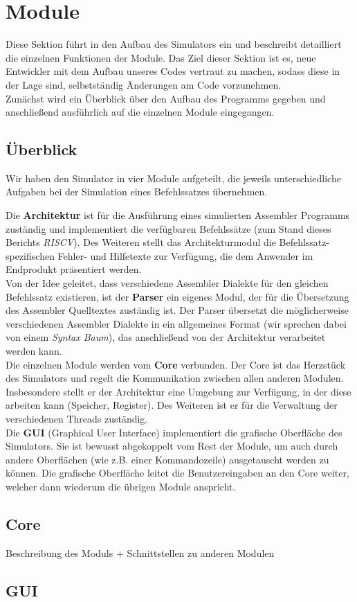 
\section{Module}

Diese Sektion führt in den Aufbau des Simulators ein und beschreibt detailliert
die einzelnen Funktionen der Module. Das Ziel dieser Sektion ist es, neue
Entwickler mit dem Aufbau unseres Codes vertraut zu machen, sodass diese in der
Lage sind, selbstständig Änderungen am Code vorzunehmen. \\
Zunächst wird ein Überblick über den Aufbau des Programms gegeben und
anschließend ausführlich auf die einzelnen Module eingegangen.

\subsection{Überblick}

Wir haben den Simulator in vier Module aufgeteilt, die jeweils unterschiedliche
Aufgaben bei der Simulation eines Befehlssatzes übernehmen.

Die \textbf{Architektur} ist für die Ausführung eines simulierten Assembler
Programms zuständig und implementiert die verfügbaren Befehlssätze (zum Stand
dieses Berichts \textit{RISCV}). Des Weiteren stellt das Architekturmodul
die Befehlssatz-spezifischen Fehler- und Hilfetexte zur Verfügung, die dem
Anwender im Endprodukt präsentiert werden. \\
Von der Idee geleitet, dass verschiedene Assembler Dialekte für den gleichen
Befehlssatz existieren, ist der \textbf{Parser} ein eigenes Modul, der für die
Übersetzung des Assembler Quelltextes zuständig ist. Der Parser übersetzt die
möglicherweise verschiedenen Assembler Dialekte in ein allgemeines Format (wir
sprechen dabei von einem \textit{Syntax Baum}), das anschließend von der Architektur
verarbeitet werden kann. \\
Die einzelnen Module werden vom \textbf{Core} verbunden. Der Core ist das
Herzstück des Simulators und regelt die Kommunikation zwischen allen anderen
Modulen. Insbesondere stellt er der Architektur eine Umgebung zur Verfügung, in
der diese arbeiten kann (Speicher, Register). Des Weiteren ist er für die
Verwaltung der verschiedenen Threads zuständig. \\
Die \textbf{GUI} (Graphical User Interface) implementiert die grafische
Oberfläche des Simulators. Sie ist bewusst abgekoppelt vom Rest der Module,
um auch durch andere Oberflächen (wie z.B. einer Kommandozeile) ausgetauscht
werden zu können. Die grafische Oberfläche leitet die Benutzereingaben an den
Core weiter, welcher dann wiederum die übrigen Module anspricht.





\subsection{Core}

Beschreibung des Moduls + Schnittstellen zu anderen Modulen

\subsection{GUI}


